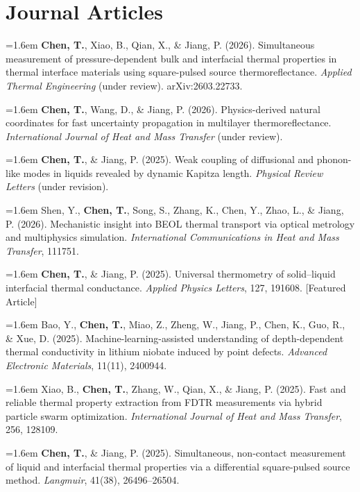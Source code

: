 \documentclass[10pt,a4paper]{article}
\newcommand{\pubitem}[1]{\par\noindent\hangindent=1.6em\hangafter=1 #1\par\addvspace{3pt}}
\begin{document}
\section{Journal Articles}

\pubitem{\textbf{Chen, T.}, Xiao, B., Qian, X., \& Jiang, P. (2026). Simultaneous measurement of pressure-dependent bulk and interfacial thermal properties in thermal interface materials using square-pulsed source thermoreflectance. \textit{Applied Thermal Engineering} (under review). arXiv:2603.22733.}

\pubitem{\textbf{Chen, T.}, Wang, D., \& Jiang, P. (2026). Physics-derived natural coordinates for fast uncertainty propagation in multilayer thermoreflectance. \textit{International Journal of Heat and Mass Transfer} (under review).}

\pubitem{\textbf{Chen, T.}, \& Jiang, P. (2025). Weak coupling of diffusional and phonon-like modes in liquids revealed by dynamic Kapitza length. \textit{Physical Review Letters} (under revision).}

\pubitem{Shen, Y., \textbf{Chen, T.}, Song, S., Zhang, K., Chen, Y., Zhao, L., \& Jiang, P. (2026). Mechanistic insight into BEOL thermal transport via optical metrology and multiphysics simulation. \textit{International Communications in Heat and Mass Transfer}, 111751.}

\pubitem{\textbf{Chen, T.}, \& Jiang, P. (2025). Universal thermometry of solid--liquid interfacial thermal conductance. \textit{Applied Physics Letters}, 127, 191608. [Featured Article]}

\pubitem{Bao, Y., \textbf{Chen, T.}, Miao, Z., Zheng, W., Jiang, P., Chen, K., Guo, R., \& Xue, D. (2025). Machine-learning-assisted understanding of depth-dependent thermal conductivity in lithium niobate induced by point defects. \textit{Advanced Electronic Materials}, 11(11), 2400944.}

\pubitem{Xiao, B., \textbf{Chen, T.}, Zhang, W., Qian, X., \& Jiang, P. (2025). Fast and reliable thermal property extraction from FDTR measurements via hybrid particle swarm optimization. \textit{International Journal of Heat and Mass Transfer}, 256, 128109.}

\pubitem{\textbf{Chen, T.}, \& Jiang, P. (2025). Simultaneous, non-contact measurement of liquid and interfacial thermal properties via a differential square-pulsed source method. \textit{Langmuir}, 41(38), 26496--26504.}
\end{document}
